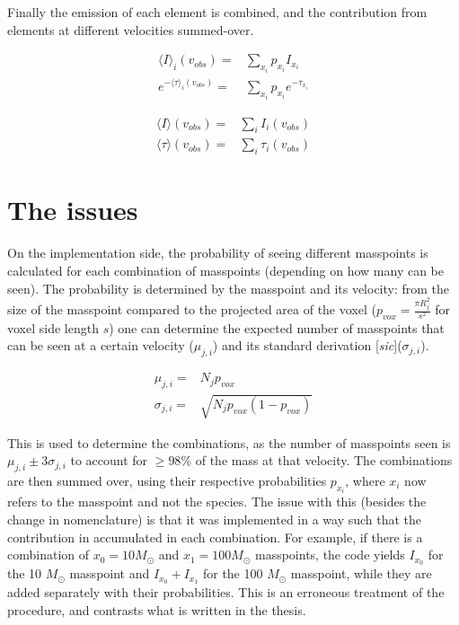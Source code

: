 \documentclass[onecolumn]{article}
\begin{document}
  Finally the emission of each element is combined, and the contribution from elements at different velocities summed-over.
  
  \begin{align*}
    \langle I \rangle_i(v_{obs}) =& \sum_{x_i} p_{x_i} I_{x_i} \\
    e^{-\langle \tau \rangle_i(v_{obs})} =& \sum_{x_i} p_{x_i} e^{-\tau_{x_i}}
  \end{align*}
  
  \begin{align*}
    \langle I \rangle(v_{obs}) =& \sum_{i} I_i(v_{obs}) \\
    \langle \tau \rangle(v_{obs}) =& \sum_{i} \tau_i(v_{obs})
  \end{align*}
  
  \section{The issues}
  On the implementation side, the probability of seeing different masspoints is calculated for each combination of masspoints (depending on how many can be seen). The probability is determined by the masspoint and its velocity: from the size of the masspoint compared to the projected area of the voxel ($p_{vox}=\frac{\pi R_j^2}{s^2}$ for voxel side length $s$) one can determine the expected number of masspoints that can be seen at a certain velocity ($\mu_{j,i}$) and its standard derivation [\textit{sic}]($\sigma_{j,i}$).
  
  \begin{align*}
    \mu_{j,i} =& N_j p_{vox} \\
    \sigma_{j,i} =& \sqrt{N_j p_{vox} (1-p_{vox})}
  \end{align*}
  
  This is used to determine the combinations, as the number of masspoints seen is $\mu_{j,i} \pm 3\sigma_{j,i}$ to account for $\geq 98 \%$ of the mass at that velocity. The combinations are then summed over, using their respective probabilities $p_{x_i}$, where $x_i$ now refers to the masspoint and not the species. The issue with this (besides the change in nomenclature) is that it was implemented in a way such that the contribution in accumulated in each combination. For example, if there is a combination of $x_0 = 10 M_\odot$ and $x_1 = 100 M_\odot$ masspoints, the code yields $I_{x_0}$ for the 10 $M_\odot$ masspoint and $I_{x_0}+I_{x_1}$ for the 100 $M_\odot$ masspoint, while they are added separately with their probabilities. This is an erroneous treatment of the procedure, and contrasts what is written in the thesis.
  
\end{document}
